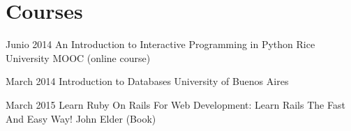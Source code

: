 \documentclass[]{cv-style}
\begin{document}

\section{Courses}

  \begin{entrylist}
  \entry
  {Junio 2014}
  {An Introduction to Interactive Programming in Python}
  {Rice University MOOC (online course)}
  {}
  \end{entrylist}

  \begin{entrylist}
  \entry
  {March 2014}
  {Introduction to Databases}
  {University of Buenos Aires}
  {}
  \end{entrylist}

  \begin{entrylist}
  \entry
  {March 2015}
  {Learn Ruby On Rails For Web Development: Learn Rails The Fast And Easy Way!}
  {John Elder (Book)}
  {}
  \end{entrylist}
\end{document}
